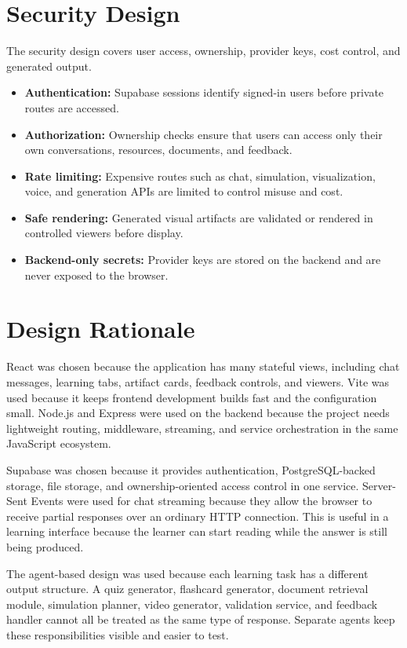 \section{Security Design}

The security design covers user access, ownership, provider keys, cost control, and generated output.
\begin{itemize}[leftmargin=1.2cm]
\item \textbf{Authentication:} Supabase sessions identify signed-in users before private routes are accessed.
\item \textbf{Authorization:} Ownership checks ensure that users can access only their own conversations, resources, documents, and feedback.
\item \textbf{Rate limiting:} Expensive routes such as chat, simulation, visualization, voice, and generation APIs are limited to control misuse and cost.
\item \textbf{Safe rendering:} Generated visual artifacts are validated or rendered in controlled viewers before display.
\item \textbf{Backend-only secrets:} Provider keys are stored on the backend and are never exposed to the browser.
\end{itemize}

\section{Design Rationale}

React was chosen because the application has many stateful views, including chat messages, learning tabs, artifact cards, feedback controls, and viewers. Vite was used because it keeps frontend development builds fast and the configuration small. Node.js and Express were used on the backend because the project needs lightweight routing, middleware, streaming, and service orchestration in the same JavaScript ecosystem.

Supabase was chosen because it provides authentication, PostgreSQL-backed storage, file storage, and ownership-oriented access control in one service. Server-Sent Events were used for chat streaming because they allow the browser to receive partial responses over an ordinary HTTP connection. This is useful in a learning interface because the learner can start reading while the answer is still being produced.

The agent-based design was used because each learning task has a different output structure. A quiz generator, flashcard generator, document retrieval module, simulation planner, video generator, validation service, and feedback handler cannot all be treated as the same type of response. Separate agents keep these responsibilities visible and easier to test.


